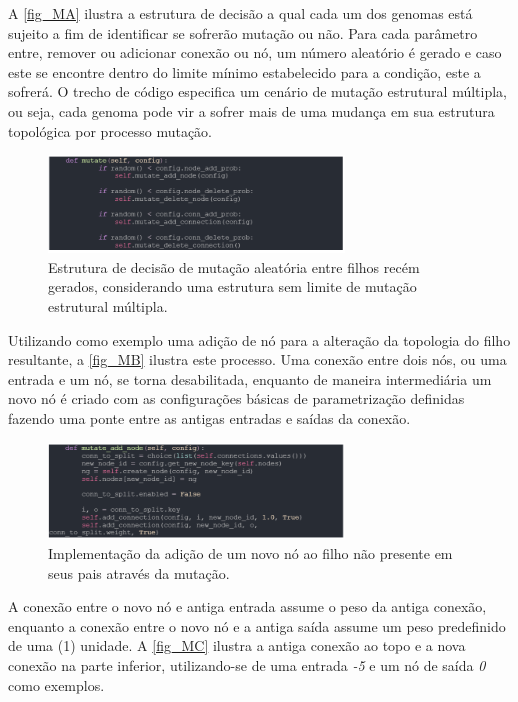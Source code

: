 A \autoref{fig_MA} ilustra a estrutura de decisão a qual cada um dos genomas está sujeito a fim de
identificar se sofrerão mutação ou não. Para cada parâmetro entre, remover ou adicionar conexão ou nó,
um número aleatório é gerado e caso este se encontre dentro do limite mínimo estabelecido para a condição,
este a sofrerá. O trecho de código especifica um cenário de mutação estrutural múltipla, ou seja,
cada genoma pode vir a sofrer mais de uma mudança em sua estrutura topológica por processo mutação.

\begin{figure}[htb]
        \centering
        \caption{\label{fig_MA}Estrutura de decisão de mutação aleatória entre filhos recém gerados, considerando uma estrutura sem limite de mutação estrutural múltipla.}
        \includegraphics[width=0.7\textwidth]{images/MA.png}
\end{figure}

Utilizando como exemplo uma adição de nó para a alteração da topologia do
filho resultante, a \autoref{fig_MB} ilustra este processo. Uma conexão entre dois nós,
ou uma entrada e um nó, se torna desabilitada, enquanto de maneira intermediária um novo
nó é criado com as configurações básicas de parametrização definidas fazendo uma ponte
entre as antigas entradas e saídas da conexão.

\begin{figure}[htb]
        \centering
        \caption{\label{fig_MB}Implementação da adição de um novo nó ao filho não presente em seus pais através da mutação.}
        \includegraphics[width=0.7\textwidth]{images/MB.png}
\end{figure}

A conexão entre o novo nó e antiga entrada assume o peso da antiga conexão, enquanto a
conexão entre o novo nó e a antiga saída assume um peso predefinido de uma (1) unidade.
A \autoref{fig_MC} ilustra a antiga conexão ao topo e a nova conexão na parte inferior,
utilizando-se de uma entrada \textit{-5} e um nó de saída \textit{0} como exemplos.

